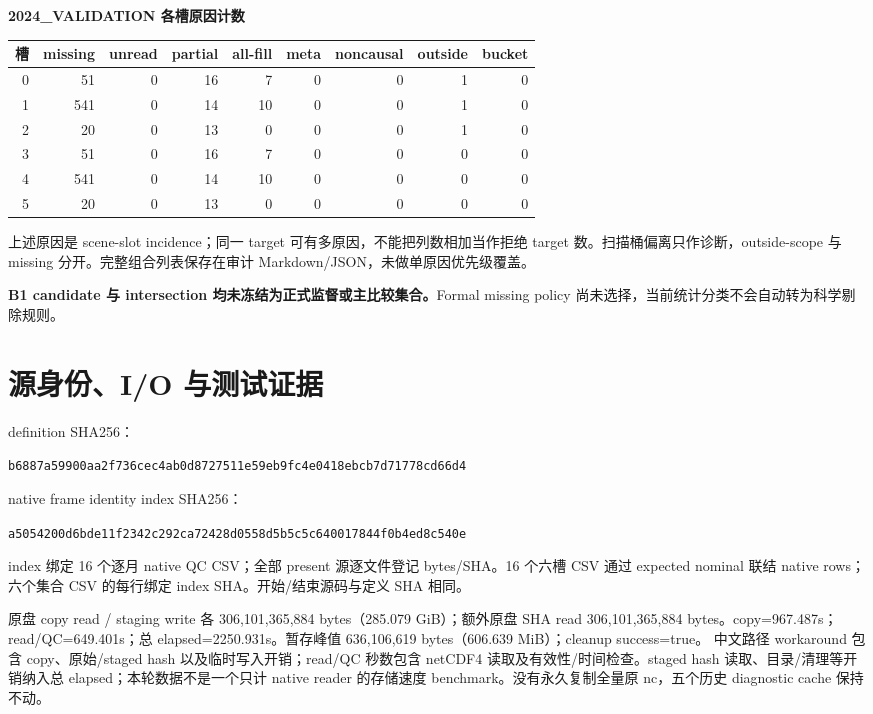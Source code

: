 \documentclass[UTF8,11pt,a4paper,fontset=windows]{ctexart}
\begin{document}
\textbf{2024\_VALIDATION 各槽原因计数}\par\begin{center}\scriptsize\begin{tabular}{rrrrrrrrr}\toprule 槽 & missing & unread & partial & all-fill & meta & noncausal & outside & bucket\\\midrule
0 & 51 & 0 & 16 & 7 & 0 & 0 & 1 & 0\\
1 & 541 & 0 & 14 & 10 & 0 & 0 & 1 & 0\\
2 & 20 & 0 & 13 & 0 & 0 & 0 & 1 & 0\\
3 & 51 & 0 & 16 & 7 & 0 & 0 & 0 & 0\\
4 & 541 & 0 & 14 & 10 & 0 & 0 & 0 & 0\\
5 & 20 & 0 & 13 & 0 & 0 & 0 & 0 & 0\\
\bottomrule\end{tabular}\end{center}

上述原因是 scene-slot incidence；同一 target 可有多原因，不能把列数相加当作拒绝 target 数。扫描桶偏离只作诊断，outside-scope 与 missing 分开。完整组合列表保存在审计 Markdown/JSON，未做单原因优先级覆盖。

\textbf{B1 candidate 与 intersection 均未冻结为正式监督或主比较集合。}Formal missing policy 尚未选择，当前统计分类不会自动转为科学剔除规则。
\newpage
\section*{源身份、I/O 与测试证据}
definition SHA256：\par{\footnotesize\texttt{b6887a59900aa2f736cec4ab0d8727511e59eb9fc4e0418ebcb7d71778cd66d4}}\par
native frame identity index SHA256：\par{\footnotesize\texttt{a5054200d6bde11f2342c292ca72428d0558d5b5c5c640017844f0b4ed8c540e}}\par
index 绑定 16 个逐月 native QC CSV；全部 present 源逐文件登记 bytes/SHA。16 个六槽 CSV 通过 expected nominal 联结 native rows；六个集合 CSV 的每行绑定 index SHA。开始/结束源码与定义 SHA 相同。

原盘 copy read / staging write 各 306,101,365,884 bytes（285.079 GiB）；额外原盘 SHA read 306,101,365,884 bytes。copy=967.487s；read/QC=649.401s；总 elapsed=2250.931s。暂存峰值 636,106,619 bytes（606.639 MiB）；cleanup success=true。
中文路径 workaround 包含 copy、原始/staged hash 以及临时写入开销；read/QC 秒数包含 netCDF4 读取及有效性/时间检查。staged hash 读取、目录/清理等开销纳入总 elapsed；本轮数据不是一个只计 native reader 的存储速度 benchmark。没有永久复制全量原 nc，五个历史 diagnostic cache 保持不动。
\end{document}
